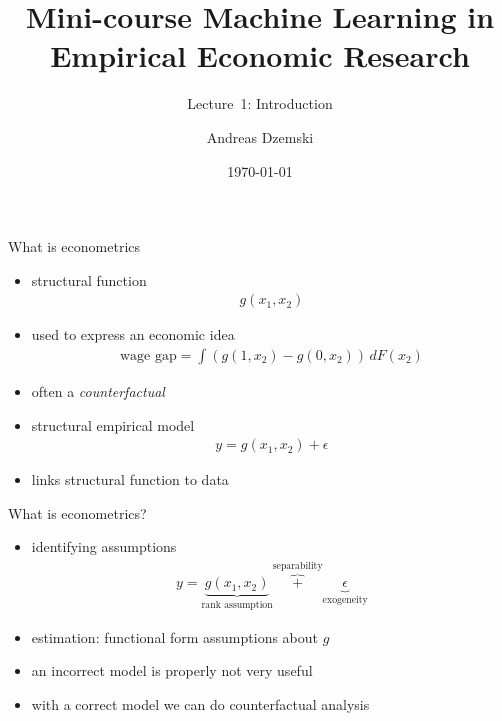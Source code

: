 \documentclass[xcolor=dvipsnames, handout]{beamer}
\author[Dzemski]{Andreas Dzemski\inst{1}}
\institute{\inst{1} University of Gothenburg}
\title{Mini-course Machine Learning in Empirical Economic Research}
\date{\today}
\subtitle{Lecture~1: Introduction}
\begin{document}
\maketitle

\begin{frame}{What is econometrics}
\pause
\begin{itemize}
  \item structural function
  \begin{align*}
    g(x_1, x_2)
  \end{align*}
  \item used to express an economic idea
  \begin{align*}
    \text{wage gap} = \int \left(g(1, x_2) - g(0, x_2)\right) \, dF(x_2)
  \end{align*}
  \item often a \emph{counterfactual}
  \pause
  \item structural empirical model
  \begin{align*}
    y = g(x_1, x_2) + \epsilon
  \end{align*}
  \item links structural function to data
\end{itemize}
\end{frame}

\begin{frame}{What is econometrics?}
  \begin{itemize}
    \item identifying assumptions
      \begin{align*}
        y = \underbrace{g(x_1, x_2)}_{\text{rank assumption}} \overbrace{+}^{\text{separability}} \underbrace{\epsilon}_{\text{exogeneity}}
      \end{align*}
    \item estimation: functional form assumptions about $g$
    \item an incorrect model is properly not very useful
    \item with a correct model we can do counterfactual analysis
  \end{itemize}
\end{frame}
\end{document}
